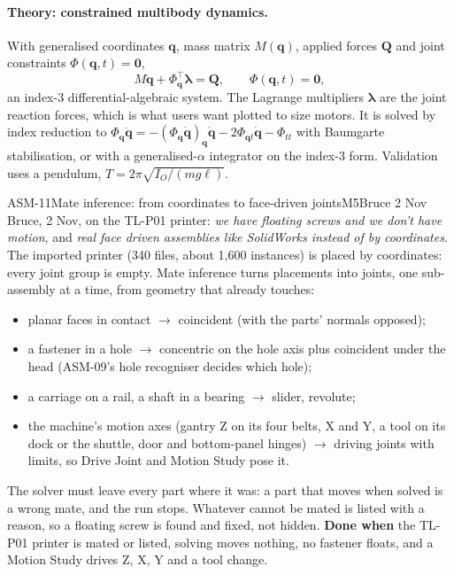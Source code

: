\paragraph{Theory: constrained multibody dynamics.} With generalised coordinates $\mathbf q$, mass
matrix $M(\mathbf q)$, applied forces $\mathbf Q$ and joint constraints $\Phi(\mathbf q,t)=\mathbf 0$,
\[
  M\ddot{\mathbf q}+\Phi_{\mathbf q}^{\!\top}\boldsymbol\lambda=\mathbf Q,\qquad \Phi(\mathbf q,t)=\mathbf 0,
\]
an index-3 differential-algebraic system. The Lagrange multipliers $\boldsymbol\lambda$ are the joint reaction
forces, which is what users want plotted to size motors. It is solved by index reduction to
$\Phi_{\mathbf q}\ddot{\mathbf q}=-(\Phi_{\mathbf q}\dot{\mathbf q})_{\mathbf q}\dot{\mathbf q}-2\Phi_{\mathbf qt}\dot{\mathbf q}-\Phi_{tt}$
with Baumgarte stabilisation, or with a generalised-$\alpha$ integrator on the index-3 form. Validation uses a
pendulum, $T=2\pi\sqrt{I_O/(m g\ell)}$.

\begin{epic}{ASM-11}{Mate inference: from coordinates to face-driven joints}{M5}{\stTodo}{Bruce 2 Nov}
Bruce, 2 Nov, on the TL-P01 printer: \emph{we have floating screws and we don't have motion}, and \emph{real face
driven assemblies like SolidWorks instead of by coordinates}. The imported printer (340 files, about 1,600
instances) is placed by coordinates: every joint group is empty. Mate inference turns placements into joints,
one sub-assembly at a time, from geometry that already touches:
\begin{itemize}
\item planar faces in contact $\rightarrow$ coincident (with the parts' normals opposed);
\item a fastener in a hole $\rightarrow$ concentric on the hole axis plus coincident under the head
(ASM-09's hole recogniser decides which hole);
\item a carriage on a rail, a shaft in a bearing $\rightarrow$ slider, revolute;
\item the machine's motion axes (gantry Z on its four belts, X and Y, a tool on its dock or the shuttle, door
and bottom-panel hinges) $\rightarrow$ driving joints with limits, so Drive Joint and Motion Study pose it.
\end{itemize}
The solver must leave every part where it was: a part that moves when solved is a wrong mate, and the run
stops. Whatever cannot be mated is listed with a reason, so a floating screw is found and fixed, not hidden.
\textbf{Done when} the TL-P01 printer is mated or listed, solving moves nothing, no fastener floats, and a
Motion Study drives Z, X, Y and a tool change.
\end{epic}

